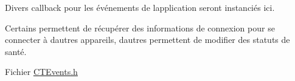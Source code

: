 Divers callback pour les événements de l\textquotesingle{}application seront instanciés ici.

Certains permettent de récupérer des informations de connexion pour se connecter à d\textquotesingle{}autres appareils, d\textquotesingle{}autres permettent de modifier des statuts de santé.

Fichier \mbox{\hyperlink{_c_t_events_8h}{CTEvents.\+h}} 